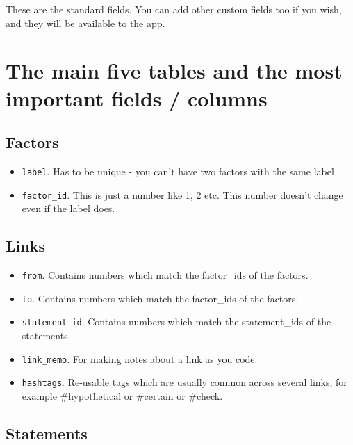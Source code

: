 \documentclass[
]{book}
\providecommand{\tightlist}{%
  \setlength{\itemsep}{0pt}\setlength{\parskip}{0pt}}
\begin{document}
These are the standard fields. You can add other custom fields too if you wish, and they will be available to the app.

\hypertarget{the-main-five-tables-and-the-most-important-fields-columns}{%
\section{The main five tables and the most important fields / columns}\label{the-main-five-tables-and-the-most-important-fields-columns}}

\hypertarget{factors}{%
\subsection{Factors}\label{factors}}

\begin{itemize}
\tightlist
\item
  \texttt{label}. Has to be unique - you can't have two factors with the same label
\item
  \texttt{factor\_id}. This is just a number like 1, 2 etc. This number doesn't change even if the label does.
\end{itemize}

\hypertarget{links}{%
\subsection{Links}\label{links}}

\begin{itemize}
\tightlist
\item
  \texttt{from}. Contains numbers which match the factor\_ids of the factors.
\item
  \texttt{to}. Contains numbers which match the factor\_ids of the factors.
\item
  \texttt{statement\_id}. Contains numbers which match the statement\_ids of the statements.
\item
  \texttt{link\_memo}. For making notes about a link as you code.
\item
  \texttt{hashtags}. Re-usable tags which are usually common across several links, for example \#hypothetical or \#certain or \#check.
\end{itemize}

\hypertarget{statements}{%
\subsection{Statements}\label{statements}}
\end{document}
